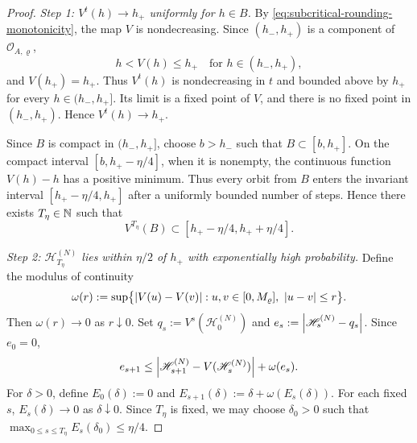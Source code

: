 \documentclass[11pt,reqno,a4paper]{article}
\begin{document}
\begin{proof}
  \emph{Step 1: $V^t(h)\to h_+$ uniformly for $h\in B$.}
  By \cref{eq:subcritical-rounding-monotonicity}, the map $V$ is
  nondecreasing. Since $(h_-,h_+)$ is a component of
  $\mathcal O_{A,\varrho}$,
  \begin{equation*}
    h<V(h)\leq h_+
    \quad\mbox{for }h\in(h_-,h_+),
  \end{equation*}
  and $V(h_+)=h_+$. Thus $V^t(h)$ is nondecreasing in $t$ and bounded above by
  $h_+$ for every $h\in(h_-,h_+]$. Its limit is a fixed point of $V$, and
  there is no fixed point in $(h_-,h_+)$. Hence $V^t(h)\to h_+$.

  Since $B$ is compact in $(h_-,h_+]$, choose $b>h_-$ such that
  $B\subset[b,h_+]$. On the compact interval
  $[b,h_+-\eta/4]$, when it is nonempty, the continuous function $V(h)-h$
  has a positive minimum. Thus every orbit from $B$ enters the invariant
  interval $[h_+-\eta/4,h_+]$ after a uniformly bounded number of steps.
  Hence there exists $T_\eta\in\mathbb{N}$ such that
  \begin{equation}\label{eq:metastable-deterministic-entrance}
    V^{T_\eta}(B)
    \subset
    [h_+-\eta/4,h_++\eta/4].
  \end{equation}

  \emph{Step 2: $\mathscr H_{T_\eta}^{(N)}$ lies within $\eta/2$ of $h_+$
  with exponentially high probability.}
  Define the modulus of continuity
  \begin{equation*}
    \omega(r)
    :=
    \sup\bigl\{\abs{V(u)-V(v)}:
    u,v\in[0,M_\varrho],\ \abs{u-v}\leq r\bigr\}.
  \end{equation*}
  Then $\omega(r)\to0$ as $r\downarrow0$. Set
  $q_s:=V^s(\mathscr H_0^{(N)})$ and
  $e_s:=\abs{\mathscr H_s^{(N)}-q_s}$. Since $e_0=0$,
  \begin{equation*}
    e_{s+1}
    \leq
    \abs{\mathscr H_{s+1}^{(N)}-V(\mathscr H_s^{(N)})}
    +\omega(e_s).
  \end{equation*}
  For $\delta>0$, define $E_0(\delta):=0$ and
  $E_{s+1}(\delta):=\delta+\omega(E_s(\delta))$. For each fixed $s$,
  $E_s(\delta)\to0$ as $\delta\downarrow0$. Since $T_\eta$ is fixed, we may
  choose $\delta_0>0$ such that
  $\max_{0\leq s\leq T_\eta}E_s(\delta_0)\leq\eta/4$.


\end{proof}
\end{document}
